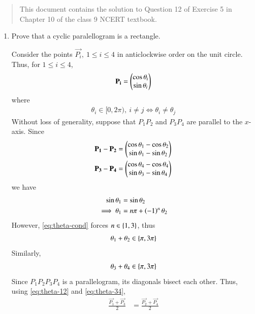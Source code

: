 \documentclass[journal,12pt,twocolumn]{IEEEtran}
\begin{document}
\begin{abstract}
    This document contains the solution to Question 12 of 
    Exercise 5 in Chapter 10 of the class 9 NCERT textbook.
\end{abstract}

\begin{enumerate}
    \item Prove that a cyclic paralellogram is a rectangle.

    \solution Consider the points $\vec{P_i},\ 1 \le i \le 4$ in anticlockwise 
    order on the unit circle. Thus, for $1 \le i \le 4$,
    \begin{align}
        \mathbf{P_i} = \begin{pmatrix}\cos\theta_i\\\sin\theta_i\end{pmatrix} 
        \label{eq:circ-point}
    \end{align}
    where 
    \begin{align}
        \theta_i \in [0,2\pi),\ i \neq j \iff \theta_i \neq \theta_j
        \label{eq:theta-cond}
    \end{align}
    Without loss of generality, suppose that $P_1P_2$ and $P_3P_4$ are parallel 
    to the $x$-axis. Since
    \begin{align}
        \mathbf{P_1}-\mathbf{P_2} &= \begin{pmatrix}\cos\theta_1-\cos\theta_2\\\sin\theta_1-\sin\theta_2\end{pmatrix} \\
        \mathbf{P_3}-\mathbf{P_4} &= \begin{pmatrix}\cos\theta_4-\cos\theta_4\\\sin\theta_3-\sin\theta_4\end{pmatrix}
    \end{align}
    we have
    \begin{align}
        \sin\theta_1&=\sin\theta_2 \\
        \implies \theta_1&=n\pi+\left(-1\right)^n\theta_2
        \label{eq:x-par}
    \end{align}
    However, \eqref{eq:theta-cond} forces $n \in \left\{1,3\right\}$, thus
    \begin{align}
        \theta_1+\theta_2 \in \left\{\pi,3\pi\right\}
        \label{eq:theta-12}
    \end{align}
    Similarly,
    \begin{align}
        \theta_3+\theta_4 \in \left\{\pi,3\pi\right\}
        \label{eq:theta-34}
    \end{align}
    Since $P_1P_2P_3P_4$ is a parallelogram, its diagonals bisect each other. 
    Thus, using \eqref{eq:theta-12} and \eqref{eq:theta-34},
    \begin{align}
        \frac{\vec{P_1}+\vec{P_3}}{2} &= \frac{\vec{P_2}+\vec{P_4}}{2} \\

\end{align}
\end{enumerate}
\end{document}
